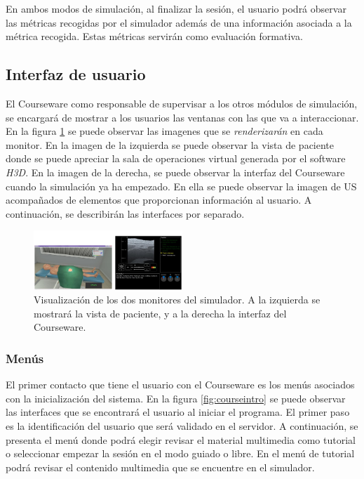 En ambos modos de simulación, al finalizar la sesión, el usuario podrá observar las métricas recogidas por el simulador además de una información asociada a la métrica recogida. Estas métricas servirán como evaluación formativa.

\subsection{Interfaz de usuario}
\label{course:ui}
El \ac{Courseware} como responsable de supervisar a los otros módulos de simulación, se encargará de mostrar a los usuarios las ventanas con las que va a interaccionar. En la figura \ref{fig:simui} se puede observar las imagenes que se \emph{renderizarán} en cada monitor. En la imagen de la izquierda se puede observar la vista de paciente donde se puede apreciar la sala de operaciones virtual generada por el software \emph{H3D}. En la imagen de la derecha, se puede observar la interfaz del \ac{Courseware} cuando la simulación ya ha empezado. En ella se puede observar la imagen de \ac{US} acompañados de elementos que proporcionan información al usuario. A continuación, se describirán las interfaces por separado.

\begin{figure}[h]
    \centering
    \includegraphics[width=0.5\textwidth]{IMG/simulatorui.PNG}
    \caption{Visualización de los dos monitores del simulador. A la izquierda se mostrará la vista de paciente, y a la derecha la interfaz del \ac{Courseware}.}
    \label{fig:simui}
\end{figure}

\subsubsection{Menús}

El primer contacto que tiene el usuario con el \ac{Courseware} es los menús asociados con la inicialización del sistema. En la figura \ref{fig:courseintro} se puede observar las interfaces que se encontrará el usuario al iniciar el programa. El primer paso es la identificación del usuario que será validado en el servidor. A continuación, se presenta el menú donde podrá elegir revisar el material multimedia como tutorial o seleccionar empezar la sesión en el modo guiado o libre. En el menú de tutorial podrá revisar el contenido multimedia que se encuentre en el simulador.

